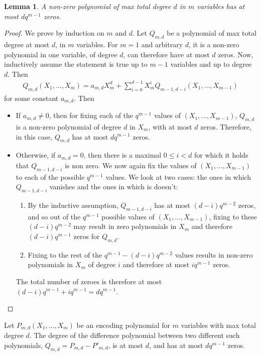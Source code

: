 \documentclass[11pt]{article} \usepackage{amssymb}
\newtheorem*{lemma*}{Lemma}
\begin{document}
\begin{enumerate}
\begin{enumerate}
\begin{lemma*}

A non-zero polynomial of
max total degree $d$ in $m$ variables has at most $dq^{m-1}$ zeros.
\end{lemma*}
\begin{proof}


We prove by induction on $m$ and $d$.
Let $Q_{m,d}$ be a polynomial of max total degree at most $d$, in $m$
variables. For $m=1$ and arbitrary $d$,
it is a non-zero polynomial in one variable, of 
degree $d$, can therefore have at most
$d$ zeros. Now, inductively assume the statement is true up to $m-1$ variables
and up to degree $d$. Then
\begin{eqnarray*}
  Q_{m,d}(X_1,\ldots,X_m) = 
  a_{m,d}X_m^d+\sum_{i=0}^{d-1}X_m^iQ_{m-1,d-i}(X_1,\ldots,X_{m-1})
\end{eqnarray*}
for some constant $a_{m,d}$. Then
\begin{itemize}
\item 
If $a_{m,d}\not=0$, then for fixing each of the $q^{m-1}$ values of
$(X_1,\ldots,X_{m-1})$, $Q_{m,d}$ is a non-zero polynomial of degree $d$
in $X_m$, with at most $d$ zeros. Therefore, in this case, $Q_{m,d}$
has at most $dq^{m-1}$ zeros. 
\item
Otherwise, if $a_{m,d}=0$, then there is a maximal $0\leq i<d$
for which it holds that $Q_{m-1,d-i}$ is non zero. We now again
fix the values of $(X_1,\ldots,X_{m-1})$ to each of the possible $q^{m-1}$
values. We look at two cases: the ones in which $Q_{m-1,d-i}$ vanishes
and the ones in which is doesn't:
\begin{enumerate}
\item 
By the inductive assumption,
$Q_{m-1,d-i}$ has at most $(d-i)q^{m-2}$ zeros, 
and so out of the $q^{m-1}$ possible values
of $(X_1,\ldots,X_{m-1})$, fixing to these $(d-i)q^{m-2}$ may 
result in zero polynomials in $X_m$ and therefore $(d-i)q^{m-1}$ 
zeros for $Q_{m,d}$. 
\item
Fixing to the rest of the 
$q^{m-1}-(d-i)q^{m-2}$ values results in non-zero polynomials
in $X_m$ of degree $i$ and therefore at most $iq^{m-1}$ zeros.
\end{enumerate}
The total number of zeroes is therefore at most $(d-i)q^{m-1}+iq^{m-1}=dq^{m-1}$.
\end{itemize}
\end{proof}
Let $P_{m,d}(X_1,\ldots,X_m)$ be an
encoding polynomial for $m$ variables with max total degree $d$. 
The degree of the difference polynomial 
between two different such polynomials, $Q_{m,d}=P_{m,d}-P'_{m,d}$, 
is at most $d$, and
has at most $dq^{m-1}$ zeros. 



\end{enumerate}
\end{enumerate}
\end{document}
